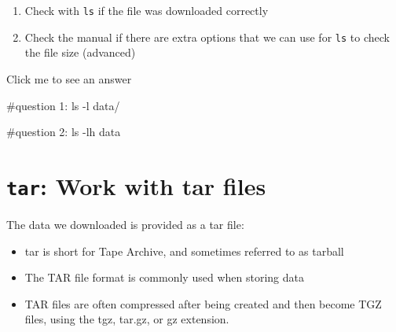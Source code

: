 \documentclass[
  letterpaper,
  DIV=11,
  numbers=noendperiod]{scrreprt}
\newenvironment{Shaded}{}{}
\newcommand{\AttributeTok}[1]{\textcolor[rgb]{0.84,0.23,0.29}{#1}}
\newcommand{\CommentTok}[1]{\textcolor[rgb]{0.42,0.45,0.49}{#1}}
\newcommand{\FunctionTok}[1]{\textcolor[rgb]{0.44,0.26,0.76}{#1}}
\newcommand{\NormalTok}[1]{\textcolor[rgb]{0.14,0.16,0.18}{#1}}
\providecommand{\tightlist}{%
  \setlength{\itemsep}{0pt}\setlength{\parskip}{0pt}}\usepackage{longtable,booktabs,array}
\begin{document}
\begin{tcolorbox}[enhanced jigsaw, breakable, left=2mm, opacitybacktitle=0.6, coltitle=black, toprule=.15mm, colframe=quarto-callout-caution-color-frame, opacityback=0, bottomtitle=1mm, rightrule=.15mm, colback=white, toptitle=1mm, leftrule=.75mm, titlerule=0mm, bottomrule=.15mm, title=\textcolor{quarto-callout-caution-color}{\faFire}\hspace{0.5em}{Exercise}, colbacktitle=quarto-callout-caution-color!10!white, arc=.35mm]

\begin{enumerate}
\def\labelenumi{\arabic{enumi}.}
\tightlist
\item
  Check with \texttt{ls} if the file was downloaded correctly
\item
  Check the manual if there are extra options that we can use for
  \texttt{ls} to check the file size (advanced)
\end{enumerate}

Click me to see an answer

\begin{Shaded}
\begin{Highlighting}[]
\CommentTok{\#question 1:}
\FunctionTok{ls} \AttributeTok{{-}l}\NormalTok{ data/}

\CommentTok{\#question 2:}
\FunctionTok{ls} \AttributeTok{{-}lh}\NormalTok{ data}
\end{Highlighting}
\end{Shaded}

\end{tcolorbox}

\section{\texorpdfstring{\texttt{tar}: Work with tar
files}{tar: Work with tar files}}\label{tar-work-with-tar-files}

The data we downloaded is provided as a tar file:

\begin{itemize}
\tightlist
\item
  tar is short for Tape Archive, and sometimes referred to as tarball
\item
  The TAR file format is commonly used when storing data
\item
  TAR files are often compressed after being created and then become TGZ
  files, using the tgz, tar.gz, or gz extension.
\end{itemize}
\end{document}
